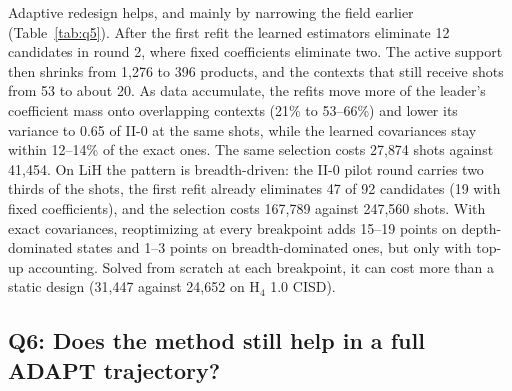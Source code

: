\documentclass[aps,pra,reprint,superscriptaddress,nofootinbib]{revtex4-2}
\begin{document}
Adaptive redesign helps, and mainly by narrowing the field earlier (Table~\ref{tab:q5}). After the first refit the learned estimators eliminate 12 candidates in round 2, where fixed coefficients eliminate two. The active support then shrinks from 1{,}276 to 396 products, and the contexts that still receive shots from 53 to about 20. As data accumulate, the refits move more of the leader's coefficient mass onto overlapping contexts (21\% to 53--66\%) and lower its variance to 0.65 of II-0 at the same shots, while the learned covariances stay within 12--14\% of the exact ones. The same selection costs 27{,}874 shots against 41{,}454. On LiH the pattern is breadth-driven: the II-0 pilot round carries two thirds of the shots, the first refit already eliminates 47 of 92 candidates (19 with fixed coefficients), and the selection costs 167{,}789 against 247{,}560 shots. With exact covariances, reoptimizing at every breakpoint adds 15--19 points on depth-dominated states and 1--3 points on breadth-dominated ones, but only with top-up accounting. Solved from scratch at each breakpoint, it can cost more than a static design (31{,}447 against 24{,}652 on H$_4$ 1.0 CISD).

\subsection{Q6: Does the method still help in a full ADAPT trajectory?}
\end{document}

